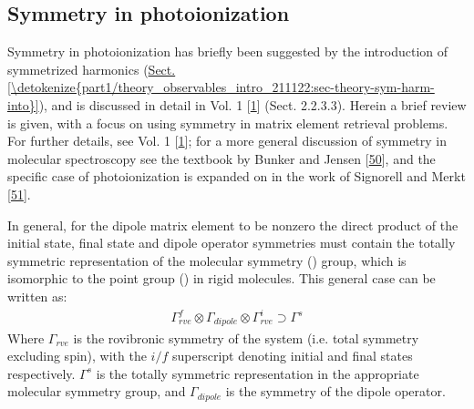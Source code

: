 \documentclass[letterpaper,table,10pt,english]{jupyterBook}
\begin{document}
\subsection{Symmetry in photoionization}
\label{\detokenize{part1/theory_photoionization_dynamics_191122:symmetry-in-photoionization}}\label{\detokenize{part1/theory_photoionization_dynamics_191122:sec-theory-symmetry-intro}}
\sphinxAtStartPar
Symmetry in photoionization has briefly been suggested by the introduction of symmetrized harmonics (\hyperref[\detokenize{part1/theory_observables_intro_211122:sec-theory-sym-harm-into}]{Sect.\@ \ref{\detokenize{part1/theory_observables_intro_211122:sec-theory-sym-harm-into}}}), and is discussed in detail in  Vol. 1 {[}\hyperlink{cite.backmatter/bibliography:id613}{1}{]} (Sect. 2.2.3.3). Herein a brief review is given, with a focus on using symmetry in matrix element retrieval problems. For further details, see  Vol. 1 {[}\hyperlink{cite.backmatter/bibliography:id613}{1}{]}; for a more general discussion of symmetry in molecular spectroscopy see the textbook by  Bunker and Jensen {[}\hyperlink{cite.backmatter/bibliography:id489}{50}{]}, and the specific case of photoionization is expanded on in the work of Signorell and Merkt {[}\hyperlink{cite.backmatter/bibliography:id797}{51}{]}.

\sphinxAtStartPar
In general, for the dipole matrix element to be non\sphinxhyphen{}zero the direct product of the initial state, final state and dipole operator symmetries must contain the totally symmetric representation of the molecular symmetry ({\hyperref[\detokenize{backmatter/glossary:term-MS}]{}}) group, which is isomorphic to the point group ({\hyperref[\detokenize{backmatter/glossary:term-PG}]{}}) in rigid molecules. This general case can be written as:
\begin{equation}\label{equation:part1/theory_photoionization_dynamics_191122:eq:rovib-selection-symm}
\begin{split}
\Gamma_{rve}^{f}\otimes\Gamma_{dipole}\otimes\Gamma_{rve}^{i}\supset\Gamma^{s}
\end{split}
\end{equation}
\sphinxAtStartPar
Where \(\Gamma_{rve}\) is the rovibronic symmetry of the system (i.e. total symmetry excluding spin), with the \(i/f\) superscript denoting
initial and final states respectively. \(\Gamma^{s}\) is the totally symmetric representation in the appropriate molecular symmetry group,
and \(\Gamma_{dipole}\) is the symmetry of the dipole operator.
\end{document}
